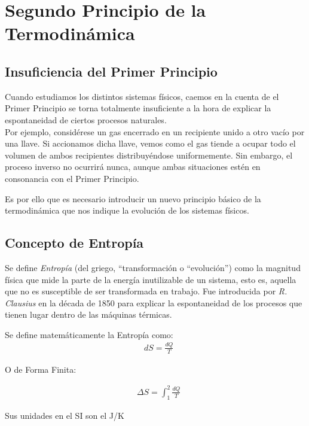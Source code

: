 \section{Segundo Principio de la Termodinámica}
\subsection{Insuficiencia del Primer Principio}

Cuando estudiamos los distintos sistemas físicos, caemos en la cuenta de el Primer Principio se torna totalmente insuficiente a la hora de explicar la espontaneidad de ciertos procesos naturales.\\

Por ejemplo, considérese un gas encerrado en un recipiente unido a otro vacío por una llave. Si accionamos dicha llave, vemos como el gas tiende a ocupar todo el volumen de ambos recipientes distribuyéndose uniformemente. Sin embargo, el proceso inverso no ocurrirá nunca, aunque ambas situaciones estén en consonancia con el Primer Principio.\\

\begin{figure}[h!]
	\centering
	\hspace{4cm}
\end{figure}

Es por ello que es necesario introducir un nuevo principio básico de la termodinámica que nos indique la evolución de los sistemas físicos.

\subsection{Concepto de Entropía}

Se define \emph{Entropía} (del griego, “transformación o “evolución”) como la magnitud física que mide la parte de la energía inutilizable de un sistema, esto es, aquella que no es susceptible de ser transformada en trabajo. Fue introducida por \emph{R. Clausius} en la década de 1850 para explicar la espontaneidad de los procesos que tienen lugar dentro de las máquinas térmicas.\\

\begin{definition}
	Se define matemáticamente la Entropía como:
	\begin{align}
	& dS = \frac{dQ}{T}
	\end{align}
	
	O de Forma Finita:
	
	\begin{align}
		& \Delta S = \int_{1}^{2} \frac{dQ}{T}
	\end{align}
	
	Sus unidades en el SI son el J/K
	
\end{definition}

